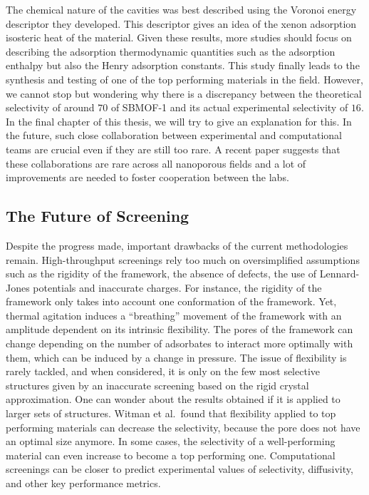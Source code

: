 \documentclass[main.tex]{subfiles}
\begin{document}
The chemical nature of the cavities was best described using the Voronoi energy descriptor they developed. This descriptor gives an idea of the xenon adsorption isosteric heat of the material. Given these results, more studies should focus on describing the adsorption thermodynamic quantities such as the adsorption enthalpy but also the Henry adsorption constants. This study finally leads to the synthesis and testing of one of the top performing materials in the field. However, we cannot stop but wondering why there is a discrepancy between the theoretical selectivity of around $70$ of SBMOF-1 and its actual experimental selectivity of $16$. In the final chapter of this thesis, we will try to give an explanation for this. In the future, such close collaboration between experimental and computational teams are crucial even if they are still too rare. A recent paper suggests that these collaborations are rare across all nanoporous fields and a lot of improvements are needed to foster cooperation between the labs.\cite{Li_2022}


\subsection{The Future of Screening}

Despite the progress made, important drawbacks of the current methodologies remain. High-throughput screenings rely too much on oversimplified assumptions such as the rigidity of the framework, the absence of defects, the use of Lennard-Jones potentials and inaccurate charges. For instance, the rigidity of the framework only takes into account one conformation of the framework. Yet, thermal agitation induces a ``breathing'' movement of the framework with an amplitude dependent on its intrinsic flexibility. The pores of the framework can change depending on the number of adsorbates to interact more optimally with them, which can be induced by a change in pressure. The issue of flexibility is rarely tackled, and when considered, it is only on the few most selective structures given by an inaccurate screening based on the rigid crystal approximation. One can wonder about the results obtained if it is applied to larger sets of structures. Witman et al.\ found that flexibility applied to top performing materials can decrease the selectivity, because the pore does not have an optimal size anymore.\cite{Witman_2017} In some cases, the selectivity of a well-performing material can even increase to become a top performing one. Computational screenings can be closer to predict experimental values of selectivity, diffusivity, and other key performance metrics.
\end{document}
